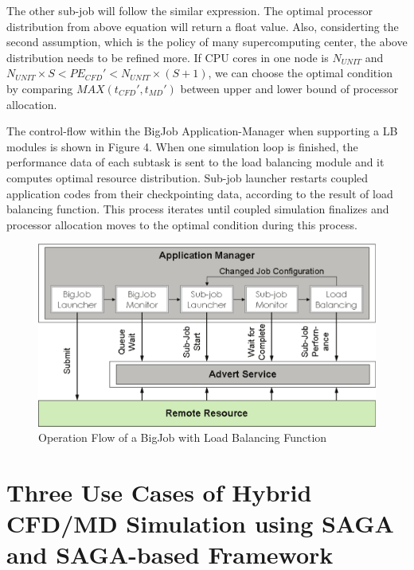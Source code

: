 \documentclass[conference,final]{IEEEtran}
\begin{document}
The other sub-job will follow the similar expression.
The optimal processor distribution from above equation will return a float value. Also, considerting the second assumption, which is the policy of many supercomputing center, the above distribution needs to be refined more. If CPU cores in one node is $N_{UNIT}$ and $N_{UNIT} \times S < PE_{CFD}' < N_{UNIT} \times (S+1)$, we can choose the optimal condition by comparing $MAX(t_{CFD}',t_{MD}')$ between upper and lower bound of processor allocation.


The control-flow within the BigJob Application-Manager when supporting a LB modules is shown
in Figure 4. When one simulation loop is finished, the performance data of each subtask is sent to the load balancing module and it computes optimal resource distribution. Sub-job launcher restarts coupled application codes from their checkpointing data, according to the result of load balancing function. This process iterates until coupled simulation finalizes and processor allocation moves to the optimal condition during this process.

\begin{figure}
\centering
\includegraphics[scale=0.40]{BigJob_with_Load_Balance}
\caption{\small Operation Flow of a BigJob with Load Balancing Function}
\end{figure}


\section{Three Use Cases of Hybrid CFD/MD Simulation using SAGA and SAGA-based Framework}
\end{document}

